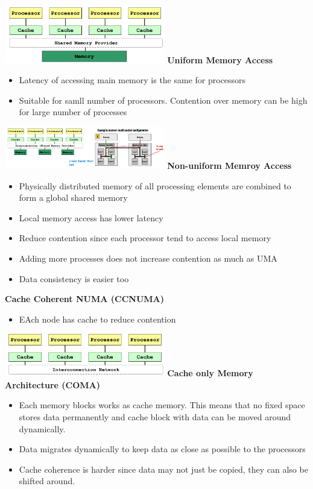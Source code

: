 \documentclass[10pt, landscape]{article}
\begin{document}
\begin{multicols}{4}
\includegraphics*[width=7cm]{uma}
\textbf{Uniform  Memory Access}
\begin{itemize}
    \item Latency of accessing main memory is the same for processors 
    \item Suitable for samll number of processors. Contention over memory can be high for large number of processes 
\end{itemize}

\includegraphics*[width=7cm]{numa}
\textbf{Non-uniform Memroy Access}
\begin{itemize}
    \item Physically distributed memory of all processing elements are combined to form a global shared memory
    \item Local memory access has lower latency
    \item Reduce contention since each processor tend to access local memory 
    \item Adding more processes does not increase contention as much as UMA 
    \item Data consistency is easier too
\end{itemize}

\textbf{Cache Coherent NUMA (CCNUMA)}
\begin{itemize}
    \item EAch node has cache to reduce contention
\end{itemize}

\includegraphics*[width=7cm]{coma}
\textbf{Cache only Memory Architecture (COMA)}
\begin{itemize}
    \item Each memory blocks works as cache memory. This means that no fixed space stores data permanently and cache block with data can be moved around dynamically.
    \item Data migrates dynamically to keep data as close as possible to the processors
    \item Cache coherence is harder since data may not just be copied, they can also be shifted around.
\end{itemize}



\end{multicols}
\end{document}
